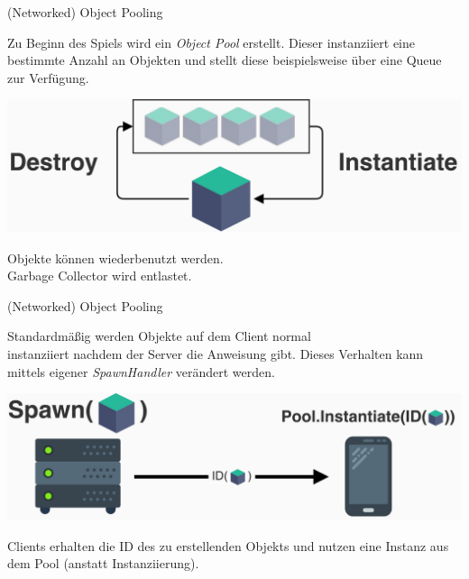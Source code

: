 \documentclass{beamer}
\begin{document}
  \begin{frame}{(Networked) Object Pooling}
  	\begin{center}
  		Zu Beginn des Spiels wird ein \emph{Object Pool} erstellt. Dieser instanziiert eine bestimmte Anzahl an Objekten und stellt diese beispielsweise über eine Queue zur Verfügung.
  	\end{center}
  	\begin{center}
  		\includegraphics[width=.9\textwidth]{bilder/objectpool.pdf}
  	\end{center}
  	\begin{center}
  		Objekte können wiederbenutzt werden.\\Garbage Collector wird entlastet.
  	\end{center}
  \end{frame}
  
  \begin{frame}{(Networked) Object Pooling}
  	\begin{center}
  		Standardmäßig werden Objekte auf dem Client normal\\ instanziiert nachdem der Server die Anweisung gibt. Dieses Verhalten kann mittels eigener \emph{SpawnHandler} verändert werden. 
  	\end{center}
  	\begin{center}
  		\includegraphics[width=.9\textwidth]{bilder/networkpool.pdf}
  	\end{center}
  	\begin{center}
  		Clients erhalten die ID des zu erstellenden Objekts und nutzen eine Instanz aus dem Pool (anstatt Instanziierung).
  	\end{center}
  \end{frame}
  
\end{document}
